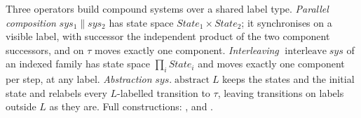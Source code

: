 \begin{definition}
  \label{def:process-algebra}
  \leanok
  Three operators build compound systems over a shared label type.
  \emph{Parallel composition} $sys_1 \parallel sys_2$ has state space $State_1 \times State_2$; it synchronises on a visible label, with successor the independent product of the two component successors, and on $\tau$ moves exactly one component.
  \emph{Interleaving} $\operatorname{interleave} sys$ of an indexed family has state space $\prod_i State_i$ and moves exactly one component per step, at any label.
  \emph{Abstraction} $sys.\operatorname{abstract} L$ keeps the states and the initial state and relabels every $L$-labelled transition to $\tau$, leaving transitions on labels outside $L$ as they are.
  Full constructions: ,  and .
\end{definition}
